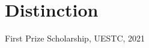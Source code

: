 \documentclass{article}
\begin{document}


















\section*{Distinction}
\indent


First Prize Scholarship, UESTC, 2021





\end{document}
